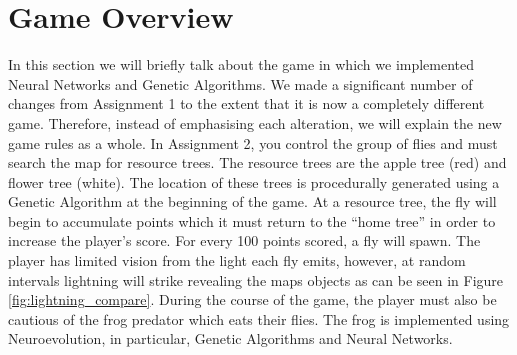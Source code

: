 \section{Game Overview}
In this section we will briefly talk about the game in which we implemented Neural Networks and Genetic Algorithms.
We made a significant number of changes from Assignment 1 to the extent that it is now a completely different game. 
Therefore, instead of emphasising each alteration, we will explain the new game rules as a whole.
In Assignment 2, you control the group
of flies and must search the map for resource trees. The resource trees are the apple tree (red) and flower tree (white).
The location of these trees is procedurally generated using a Genetic Algorithm at the beginning of the game. At a resource tree, the fly will begin to accumulate points which it must return to the ``home tree'' in order to increase the player's score. For every 100 points scored, a fly will spawn.
The player has limited vision from
the light each fly emits, however, at random intervals lightning will strike revealing the maps objects as can be seen in Figure \ref{fig:lightning_compare}. During the course
of the game, the player must also be cautious of the frog predator which eats their flies. The frog is implemented using Neuroevolution, in particular, Genetic Algorithms and Neural Networks.
